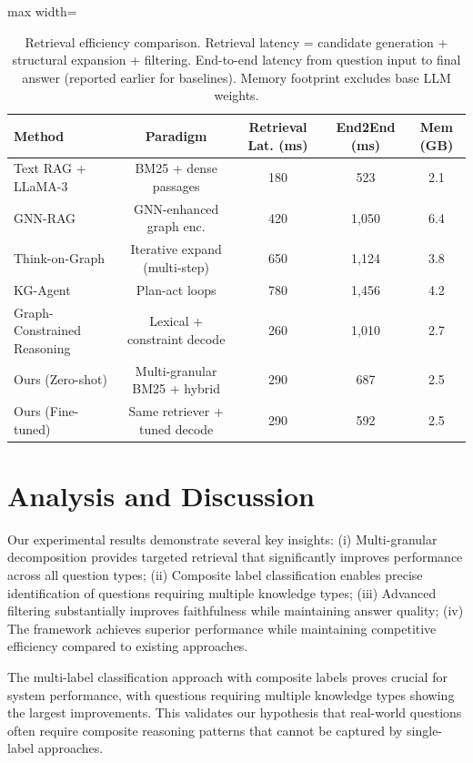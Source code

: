 \documentclass[conference]{IEEEtran}
\begin{document}
\begin{table}[t]
\centering
\caption{Retrieval efficiency comparison. Retrieval latency = candidate generation + structural expansion + filtering. End-to-end latency from question input to final answer (reported earlier for baselines). Memory footprint excludes base LLM weights.}
\label{tab:retrieval_speed}
\begin{adjustbox}{max width=\columnwidth}
\begin{tabular}{lcccc}
\toprule
Method & Paradigm & Retrieval Lat. (ms) & End2End (ms) & Mem (GB) \\
\midrule
Text RAG + LLaMA-3 & BM25 + dense passages & 180 & 523 & 2.1 \\
GNN-RAG & GNN-enhanced graph enc. & 420 & 1,050 & 6.4 \\
Think-on-Graph & Iterative expand (multi-step) & 650 & 1,124 & 3.8 \\
KG-Agent & Plan-act loops & 780 & 1,456 & 4.2 \\
Graph-Constrained Reasoning & Lexical + constraint decode & 260 & 1,010 & 2.7 \\
Ours (Zero-shot) & Multi-granular BM25 + hybrid & 290 & 687 & 2.5 \\
Ours (Fine-tuned) & Same retriever + tuned decode & 290 & 592 & 2.5 \\
\bottomrule
\end{tabular}
\end{adjustbox}
\end{table}

\section{Analysis and Discussion}

Our experimental results demonstrate several key insights: (i) Multi-granular decomposition provides targeted retrieval that significantly improves performance across all question types; (ii) Composite label classification enables precise identification of questions requiring multiple knowledge types; (iii) Advanced filtering substantially improves faithfulness while maintaining answer quality; (iv) The framework achieves superior performance while maintaining competitive efficiency compared to existing approaches.

The multi-label classification approach with composite labels proves crucial for system performance, with questions requiring multiple knowledge types showing the largest improvements. This validates our hypothesis that real-world questions often require composite reasoning patterns that cannot be captured by single-label approaches.
\end{document}
